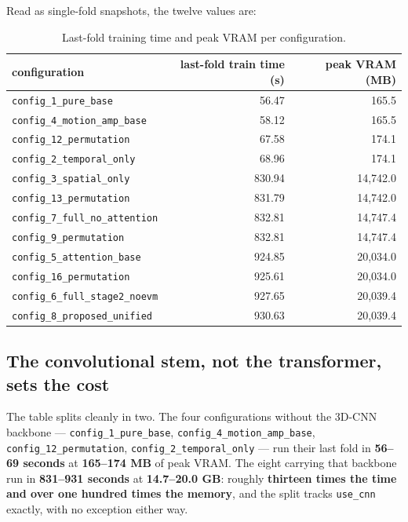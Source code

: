 Read as single-fold snapshots, the twelve values are:

\begin{table}[htbp]
	\centering
	\begin{tabular}{l r r}
		\hline
		\textbf{configuration} & \textbf{last-fold train time (s)} & \textbf{peak VRAM (MB)} \\
		\hline
		\texttt{config\_1\_pure\_base}          & 56.47  & 165.5 \\
		\texttt{config\_4\_motion\_amp\_base}   & 58.12  & 165.5 \\
		\texttt{config\_12\_permutation}        & 67.58  & 174.1 \\
		\texttt{config\_2\_temporal\_only}      & 68.96  & 174.1 \\
		\texttt{config\_3\_spatial\_only}       & 830.94 & 14,742.0 \\
		\texttt{config\_13\_permutation}        & 831.79 & 14,742.0 \\
		\texttt{config\_7\_full\_no\_attention} & 832.81 & 14,747.4 \\
		\texttt{config\_9\_permutation}         & 832.81 & 14,747.4 \\
		\texttt{config\_5\_attention\_base}     & 924.85 & 20,034.0 \\
		\texttt{config\_16\_permutation}        & 925.61 & 20,034.0 \\
		\texttt{config\_6\_full\_stage2\_noevm} & 927.65 & 20,039.4 \\
		\texttt{config\_8\_proposed\_unified}   & 930.63 & 20,039.4 \\
		\hline
	\end{tabular}
	\caption[Last-fold training time and peak VRAM per configuration]{Last-fold training time and peak VRAM per configuration.}
	\label{tab:compute-per-config}
\end{table}

\subsection{The convolutional stem, not the transformer, sets the cost}
\label{sec:stem-sets-cost}

The table splits cleanly in two. The four configurations without the 3D-CNN backbone --- \texttt{config\_1\_pure\_base}, \texttt{config\_4\_motion\_amp\_base}, \texttt{config\_12\_permutation}, \texttt{config\_2\_temporal\_only} --- run their last fold in \textbf{56--69 seconds} at \textbf{165--174 MB} of peak VRAM. The eight carrying that backbone run in \textbf{831--931 seconds} at \textbf{14.7--20.0 GB}: roughly \textbf{thirteen times the time and over one hundred times the memory}, and the split tracks \texttt{use\_cnn} exactly, with no exception either way.

